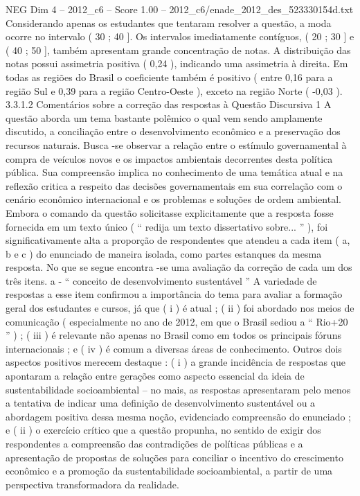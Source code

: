 \begin{textsample}{NEG Dim 4 – 2012\_c6 – Score 1.00 – 2012\_c6/enade\_2012\_des\_523330154d.txt}
Considerando apenas os estudantes que tentaram resolver a questão, a moda ocorre no intervalo ( 30 ; 40 ].
Os intervalos imediatamente contíguos, ( 20 ; 30 ] e ( 40 ; 50 ], também apresentam grande concentração de notas.
A distribuição das notas possui assimetria positiva ( 0,24 ), indicando uma assimetria à direita.
Em todas as regiões do Brasil o coeficiente também é positivo ( entre 0,16 para a região Sul e 0,39 para a região Centro-Oeste ), exceto na região Norte ( -0,03 ). 3.3.1.2 Comentários sobre a correção das respostas à Questão Discursiva 1 A questão aborda um tema bastante polêmico o qual vem sendo amplamente discutido, a conciliação entre o desenvolvimento econômico e a preservação dos recursos naturais.
Busca -se observar a relação entre o estímulo governamental à compra de veículos novos e os impactos ambientais decorrentes desta política pública.
Sua compreensão implica no conhecimento de uma temática atual e na reflexão critica a respeito das decisões governamentais em sua correlação com o cenário econômico internacional e os problemas e soluções de ordem ambiental.
Embora o comando da questão solicitasse explicitamente que a resposta fosse fornecida em um texto único ( “ redija um texto dissertativo sobre... ” ), foi significativamente alta a proporção de respondentes que atendeu a cada item ( a, b e c ) do enunciado de maneira isolada, como partes estanques da mesma resposta.
No que se segue encontra -se uma avaliação da correção de cada um dos três itens. a - “ conceito de desenvolvimento sustentável ” A variedade de respostas a esse item confirmou a importância do tema para avaliar a formação geral dos estudantes e cursos, já que ( i ) é atual ; ( ii ) foi abordado nos meios de comunicação ( especialmente no ano de 2012, em que o Brasil sediou a “ Rio+20 ” ) ; ( iii ) é relevante não apenas no Brasil como em todos os principais fóruns internacionais ; e ( iv ) é comum a diversas áreas de conhecimento.
Outros dois aspectos positivos merecem destaque : ( i ) a grande incidência de respostas que apontaram a relação entre gerações como aspecto essencial da ideia de sustentabilidade socioambiental – no mais, as respostas apresentaram pelo menos a tentativa de indicar uma definição de desenvolvimento sustentável ou a abordagem positiva dessa mesma noção, evidenciado compreensão do enunciado ; e ( ii ) o exercício crítico que a questão propunha, no sentido de exigir dos respondentes a compreensão das contradições de políticas públicas e a apresentação de propostas de soluções para conciliar o incentivo do crescimento econômico e a promoção da sustentabilidade socioambiental, a partir de uma perspectiva transformadora da realidade.

\end{textsample}
